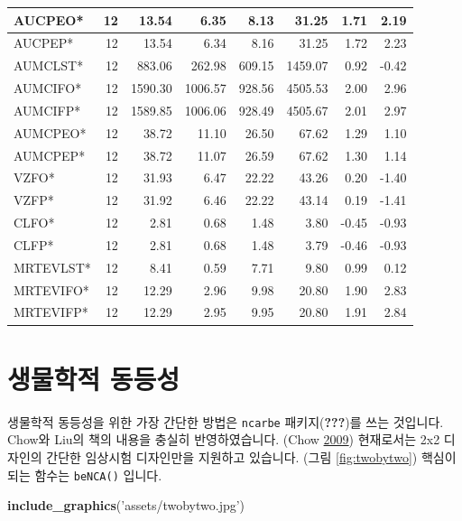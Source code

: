 \documentclass[12pt,]{krantz}
\newenvironment{Shaded}{\begin{snugshade}}{\end{snugshade}}
\newcommand{\KeywordTok}[1]{\textcolor[rgb]{0.13,0.29,0.53}{\textbf{#1}}}
\newcommand{\StringTok}[1]{\textcolor[rgb]{0.31,0.60,0.02}{#1}}
\newcommand{\NormalTok}[1]{#1}
\theoremstyle{definition}
\theoremstyle{definition}
\theoremstyle{definition}
\theoremstyle{remark}
\begin{document}
\begin{tabular}{l|r|r|r|r|r|r|r}
AUCPEO* & 12 & 13.54 & 6.35 & 8.13 & 31.25 & 1.71 & 2.19\\
\hline
AUCPEP* & 12 & 13.54 & 6.34 & 8.16 & 31.25 & 1.72 & 2.23\\
\hline
AUMCLST* & 12 & 883.06 & 262.98 & 609.15 & 1459.07 & 0.92 & -0.42\\
\hline
AUMCIFO* & 12 & 1590.30 & 1006.57 & 928.56 & 4505.53 & 2.00 & 2.96\\
\hline
AUMCIFP* & 12 & 1589.85 & 1006.06 & 928.49 & 4505.67 & 2.01 & 2.97\\
\hline
AUMCPEO* & 12 & 38.72 & 11.10 & 26.50 & 67.62 & 1.29 & 1.10\\
\hline
AUMCPEP* & 12 & 38.72 & 11.07 & 26.59 & 67.62 & 1.30 & 1.14\\
\hline
VZFO* & 12 & 31.93 & 6.47 & 22.22 & 43.26 & 0.20 & -1.40\\
\hline
VZFP* & 12 & 31.92 & 6.46 & 22.22 & 43.14 & 0.19 & -1.41\\
\hline
CLFO* & 12 & 2.81 & 0.68 & 1.48 & 3.80 & -0.45 & -0.93\\
\hline
CLFP* & 12 & 2.81 & 0.68 & 1.48 & 3.79 & -0.46 & -0.93\\
\hline
MRTEVLST* & 12 & 8.41 & 0.59 & 7.71 & 9.80 & 0.99 & 0.12\\
\hline
MRTEVIFO* & 12 & 12.29 & 2.96 & 9.98 & 20.80 & 1.90 & 2.83\\
\hline
MRTEVIFP* & 12 & 12.29 & 2.95 & 9.95 & 20.80 & 1.91 & 2.84\\
\hline
\end{tabular}

\section{생물학적 동등성}\label{bioequivalence}

생물학적 동등성을 위한 가장 간단한 방법은 \texttt{ncarbe}
패키지({\textbf{???}})를 쓰는 것입니다.\\
Chow와 Liu의 책의 내용을 충실히 반영하였습니다. (Chow
\protect\hyperlink{ref-chow2009design}{2009}) 현재로서는 2x2 디자인의
간단한 임상시험 디자인만을 지원하고 있습니다. (그림 \ref{fig:twobytwo})
핵심이 되는 함수는 \texttt{beNCA()} 입니다.

\begin{Shaded}
\begin{Highlighting}[]
\KeywordTok{include_graphics}\NormalTok{(}\StringTok{'assets/twobytwo.jpg'}\NormalTok{)}
\end{Highlighting}
\end{Shaded}
\end{document}

